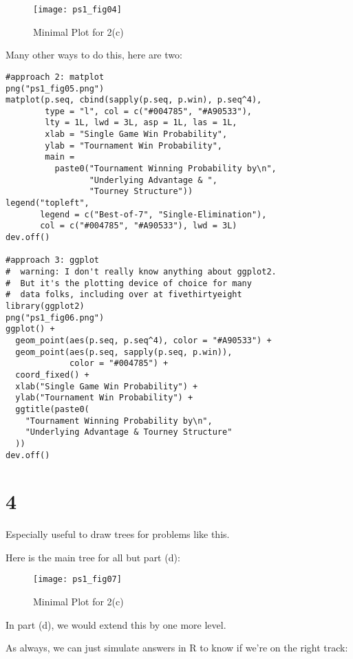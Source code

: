 \documentclass{article}
\begin{document}
\begin{figure}[htbp]
\centering
\texttt{[image: ps1\_fig04]}
\caption{Minimal Plot for 2(c)}
\label{fig:prob_bells}
\end{figure}

Many other ways to do this, here are two:

\begin{lstlisting}
#approach 2: matplot
png("ps1_fig05.png")
matplot(p.seq, cbind(sapply(p.seq, p.win), p.seq^4),
        type = "l", col = c("#004785", "#A90533"),
        lty = 1L, lwd = 3L, asp = 1L, las = 1L,
        xlab = "Single Game Win Probability",
        ylab = "Tournament Win Probability",
        main = 
          paste0("Tournament Winning Probability by\n",
                 "Underlying Advantage & ", 
                 "Tourney Structure"))
legend("topleft", 
       legend = c("Best-of-7", "Single-Elimination"),
       col = c("#004785", "#A90533"), lwd = 3L)
dev.off()

#approach 3: ggplot
#  warning: I don't really know anything about ggplot2.
#  But it's the plotting device of choice for many
#  data folks, including over at fivethirtyeight
library(ggplot2)
png("ps1_fig06.png")
ggplot() + 
  geom_point(aes(p.seq, p.seq^4), color = "#A90533") + 
  geom_point(aes(p.seq, sapply(p.seq, p.win)), 
             color = "#004785") + 
  coord_fixed() + 
  xlab("Single Game Win Probability") + 
  ylab("Tournament Win Probability") + 
  ggtitle(paste0(
    "Tournament Winning Probability by\n",
    "Underlying Advantage & Tourney Structure"
  ))
dev.off()
\end{lstlisting}

\section*{4} 

Especially useful to draw trees for problems like this.

Here is the main tree for all but part (d):

\begin{figure}[htbp]
\centering
\texttt{[image: ps1\_fig07]}
\caption{Minimal Plot for 2(c)}
\label{fig:zika}
\end{figure}

In part (d), we would extend this by one more level.

As always, we can just simulate answers in R to know if we're on the right track:
\end{document}
